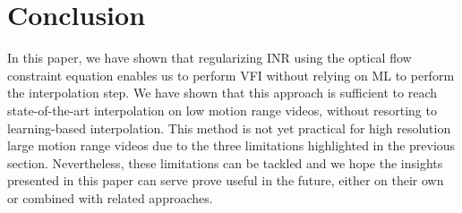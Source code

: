 \documentclass{article}
\begin{document}
\section{Conclusion}

In this paper, we have shown that regularizing INR using the optical flow constraint equation
enables us to perform VFI without relying on ML to perform the interpolation step.
We have shown that this approach is sufficient to reach state-of-the-art interpolation on low motion range videos,
without resorting to learning-based interpolation.
This method is not yet practical for high resolution large motion range videos due to the three limitations highlighted in the previous section.
Nevertheless, these limitations can be tackled and we hope the insights presented in this paper can serve prove useful in the future,
either on their own or combined with related approaches.



\end{document}
